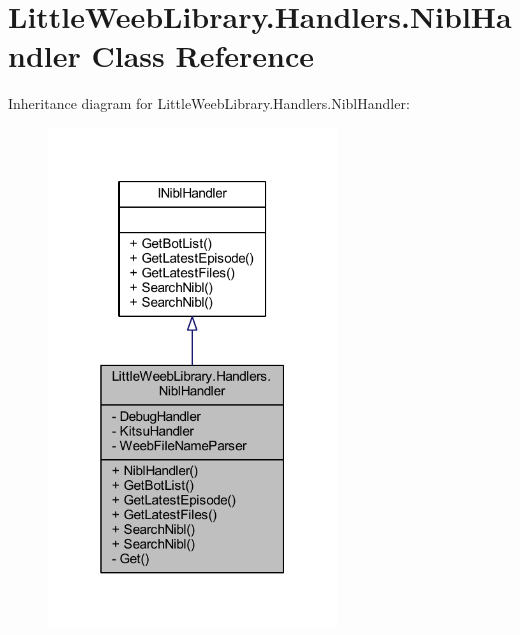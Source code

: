 \hypertarget{class_little_weeb_library_1_1_handlers_1_1_nibl_handler}{}\section{Little\+Weeb\+Library.\+Handlers.\+Nibl\+Handler Class Reference}
\label{class_little_weeb_library_1_1_handlers_1_1_nibl_handler}


Inheritance diagram for Little\+Weeb\+Library.\+Handlers.\+Nibl\+Handler\+:\nopagebreak
\begin{figure}[H]
\begin{center}
\leavevmode
\includegraphics[width=217pt]{class_little_weeb_library_1_1_handlers_1_1_nibl_handler__inherit__graph}
\end{center}
\end{figure}


